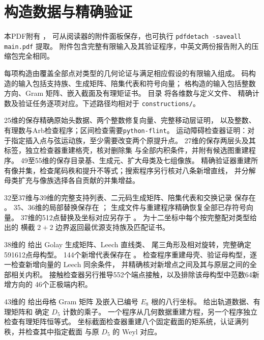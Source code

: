 \section{构造数据与精确验证}\label{app:data}

本PDF附有
，
可从阅读器的附件面板保存，也可执行
\texttt{pdfdetach -saveall main.pdf} 提取。
附件包含完整有限输入及其验证程序，中英文两份报告附入的压缩包完全相同。

每项构造由覆盖全部点对类型的几何论证与满足相应假设的有限输入组成。
码构造的输入包括支持族、生成矩阵、陪集代表和符号向量；
格构造的输入包括整数方向、Gram 矩阵、嵌入截面及有理矩证书。
目录  将各维数与定义文件、
精确计数及验证任务逐项对应。下述路径均相对于 \texttt{constructions/}。

25维的保存精确原始头数据、两个整数修复向量、完整移动层证明，
以及整数、有理数与Arb检查程序；区间检查需要\texttt{python-flint}。
运动障碍检查器证明：对于指定插入点与弦运动族，至少需要改变两个原提升点。
27维的保存两层头及其标签，独立检查器重建格壳，核对删除集
与全部内积条件，并附有候选图重建程序。
49至55维的保存目录基、生成元、扩大母类及七组像族。
精确验证器重建所有像并集，检查尾码秩和提升不等式；搜索程序另行核对八条新增直线，
并分解母类扩充与像族选择各自贡献的并集增益。

32至37维与39维的完整支持列表、二元码生成矩阵、陪集代表和交换记录
保存在 。
35、36维的局部替换保存在 ；
生成文件与重建程序精确恢复全部已存符号向量。
37维的512点替换及坐标对应另存于 。
 为十二坐标中每个按完整配对类型给出的
横截 $2+2$ 边界返回最优源支持族及匹配证书。

38维的  给出 Golay 生成矩阵、Leech 直线类、
尾三角形及相对旋转，完整确定591612点母构型。
144个新增代表保存在 。
检查程序重建母壳、验证母构型，逐一检查新增向量的 Leech 同余条件，
并精确核对新增点之间及其与原层之间的全部相关内积。
接触检查器另行推导552个端点接触，以及排除该母构型中范数64新增方向的
46个正极端内积。

43维的  给出母格 Gram 矩阵
及嵌入已编号 $E_8$ 根的八行坐标。
 给出轨道数据、有理矩阵和
确定 $D_5$ 计数的乘子。
一个程序从几何数据重建方程，另一个程序独立检查有理矩阵恒等式。
坐标截面检查器重建八个固定截面的矩系统，认证满列秩，并检查其中指定截面
与原 $D_5$ 的 Weyl 对应。

